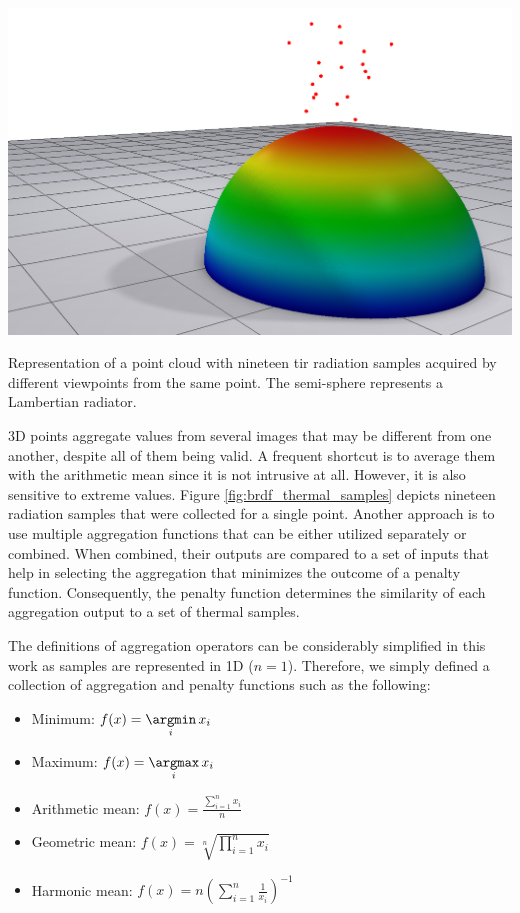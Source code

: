 \begin{marginfigure}[.0cm]
	\includegraphics{figs/thermal_projection/brdf_thermal.png}
	\caption{Representation of a point cloud with nineteen \acrshort{tir} radiation samples acquired by different viewpoints from the same point. The semi-sphere represents a Lambertian radiator. }
	\label{fig:brdf_thermal_samples}
\end{marginfigure}
3D points aggregate values from several images that may be different from one another, despite all of them being valid. A frequent shortcut is to average them with the arithmetic mean \cite{javadnejad_photogrammetric_2020} since it is not intrusive at all. However, it is also sensitive to extreme values. Figure \ref{fig:brdf_thermal_samples} depicts nineteen radiation samples that were collected for a single point. Another approach is to use multiple aggregation functions that can be either utilized separately or combined. When combined, their outputs are compared to a set of inputs that help in selecting the aggregation that minimizes the outcome of a penalty function. Consequently, the penalty function determines the similarity of each aggregation output to a set of thermal samples.

The definitions of aggregation operators can be considerably simplified in this work as samples are represented in 1D ($n = 1$). Therefore, we simply defined a collection of aggregation and penalty functions such as the following:
\begin{itemize}
    \setlength\itemsep{0.3em}
    \item Minimum: $f(x) = \underset{i}{\argmin}\, x_i$
    \item Maximum: $f(x) = \underset{i}{\argmax}\, x_i$
    \setlength\itemsep{-0.1em}
    \item Arithmetic mean: $f(x) = \frac{\sum_{i=1}^{n} x_i}{n}$
    \setlength\itemsep{0.85em}
    \item Geometric mean: $f(x) = \sqrt[n]{\prod_{i=1}^{n} x_i}$
    \setlength\itemsep{0.3em}
    \item Harmonic mean: $f(x) = n\left( \sum_{i=1}^{n} \frac{1}{x_i} \right)^{-1}$
\end{itemize}

